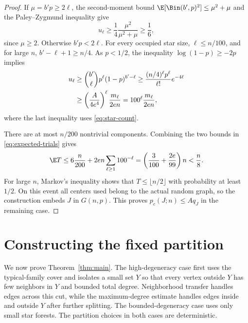 \begin{proof}
If $\mu=b'p\geq2\ell$, the second-moment bound
$\E[\Bin(b',p)^2]\leq\mu^2+\mu$ and the Paley--Zygmund
inequality give
\[
 u_\ell\geq\frac14\frac{\mu^2}{\mu^2+\mu}\geq\frac16,
\]
since $\mu\geq2$. Otherwise $b'p<2\ell$. For every occupied
star size, $\ell\leq n/100$, and for large $n$,
$b'-\ell+1\geq n/4$. As $p<1/2$, the inequality
$\log(1-p)\geq-2p$ implies
\begin{align}
 u_\ell
 &\geq\binom{b'}{\ell}p^\ell(1-p)^{b'-\ell}
 \geq\frac{(n/4)^\ell p^\ell}{\ell!}e^{-4\ell}\notag\\
 &\geq\left(\frac{A}{4e^4}\right)^\ell
        \frac{m_\ell}{2e n}
 =100^\ell\frac{m_\ell}{2e n},
 \label{eq:star-small-mean}
\end{align}
where the last inequality uses \eqref{eq:star-count}.

There are at most $n/200$ nontrivial components. Combining
the two bounds in \eqref{eq:expected-trials} gives
\[
 \E T\leq6\frac{n}{200}+2e n\sum_{\ell\geq1}100^{-\ell}
 =\left(\frac3{100}+\frac{2e}{99}\right)n<\frac n8.
\]
For large $n$, Markov's inequality shows that
$T\leq\lfloor n/2\rfloor$ with probability at least $1/2$.
On this event all centers used belong to the actual random graph,
so the construction embeds $J$ in $G(n,p)$. This proves
$p_c(J;n)\leq Aq_J$ in the remaining case.
\end{proof}

\section{Constructing the fixed partition}
\label{sec:assembly}

We now prove Theorem~\ref{thm:main}. The high-degeneracy case
first uses the typical-family cover and isolates a small set $Y$
so that every vertex outside $Y$ has few neighbors in $Y$ and
bounded total degree. Neighborhood transfer handles edges across
this cut, while the maximum-degree estimate handles edges inside
and outside $Y$ after further splitting. The bounded-degeneracy
case uses only small star forests. The partition choices in both
cases are deterministic.

